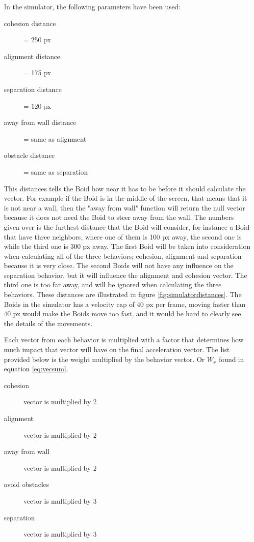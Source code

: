 In the simulator, the following parameters have been used:
\begin{description}
\item[cohesion distance] = 250 px
\item[alignment distance] = 175 px
\item[separation distance] = 120 px
\item[away from wall distance] = same as alignment
\item[obstacle distance] = same as separation
\end{description}
This distances tells the Boid how near it has to be before it should calculate the vector. For example if the Boid is in the middle of the screen, that means that it is not near a wall, then the "away from wall" function will return the null vector because it does not need the Boid to steer away from the wall.
The numbers given over is the furthest distance that the Boid will consider, for instance a Boid that have three neighbors, where one of them is 100 px away, the second one is  while the third one is 300 px away. The first Boid will be taken into consideration when calculating all of the three behaviors; cohesion, alignment and separation because it is very close. The second Boids will not have any influence on the separation behavior, but it will influence the alignment and cohesion vector. The third one is too far away, and will be ignored when calculating the three behaviors. These distances are illustrated in figure \ref{fig:simulatordistances}.
The Boids in the simulator has a velocity cap of 40 px per frame, moving faster than 40 px would make the Boids move too fast, and it would be hard to clearly see the details of the movements. 

Each vector from each behavior is multiplied with a factor that determines how much impact that vector will have on the final acceleration vector.
The list provided below is the weight multiplied by the behavior vector. Or $W_x$ found in equation \ref{eq:vecsum}.
\begin{description}
\item[cohesion] vector is multiplied by 2
\item[alignment] vector is multiplied by 2
\item[away from wall] vector is multiplied by 2
\item[avoid obstacles] vector is multiplied by 3
\item[separation] vector is multiplied by 3
\end{description}

